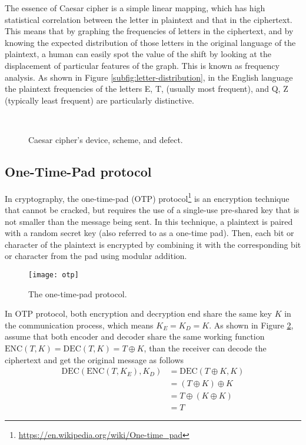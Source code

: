 \documentclass{easyclass}
\begin{document}
The essence of Caesar cipher is a simple linear mapping, which has high statistical correlation between the letter in plaintext and that in the ciphertext. This means that by graphing the frequencies of letters in the ciphertext, and by knowing the expected distribution of those letters in the original language of the plaintext, a human can easily spot the value of the shift by looking at the displacement of particular features of the graph. This is known as frequency analysis. As shown in Figure \ref{subfig:letter-distribution}, in the English language the plaintext frequencies of the letters E, T, (usually most frequent), and Q, Z (typically least frequent) are particularly distinctive.

\begin{figure}[h]
	\centering
	\hspace{0.1\textwidth}
	\\
	\caption{Caesar cipher's device, scheme, and defect.}
	\label{fig:caesar-cipher}
\end{figure}

\subsection{One-Time-Pad protocol}
In cryptography, the one-time-pad (OTP) protocol\footnote{\url{https://en.wikipedia.org/wiki/One-time_pad}} is an encryption technique that cannot be cracked, but requires the use of a single-use pre-shared key that is not smaller than the message being sent. In this technique, a plaintext is paired with a random secret key (also referred to as a one-time pad). Then, each bit or character of the plaintext is encrypted by combining it with the corresponding bit or character from the pad using modular addition.

\begin{figure}[h]
	\centering
	\texttt{[image: otp]}
	\caption{The one-time-pad protocol.}
	\label{fig:otp}
\end{figure}

In OTP protocol, both encryption and decryption end share the same key $K$ in the communication process, which means $K_E=K_D=K$. As shown in Figure \ref{fig:otp}, assume that both encoder and decoder share the same working function $\textrm{ENC}(T,K)=\textrm{DEC}(T,K)=T\oplus K$, than the receiver can decode the ciphertext and get the original message as follows 
\begin{equation}
	\begin{aligned}
		\textrm{DEC}(\textrm{ENC}(T,K_E),K_D)&=\textrm{DEC}(T\oplus K, K)\\
		&=(T\oplus K)\oplus K\\
		&=T\oplus (K\oplus K)\\
		&=T		
	\end{aligned}
\end{equation}
\end{document}
